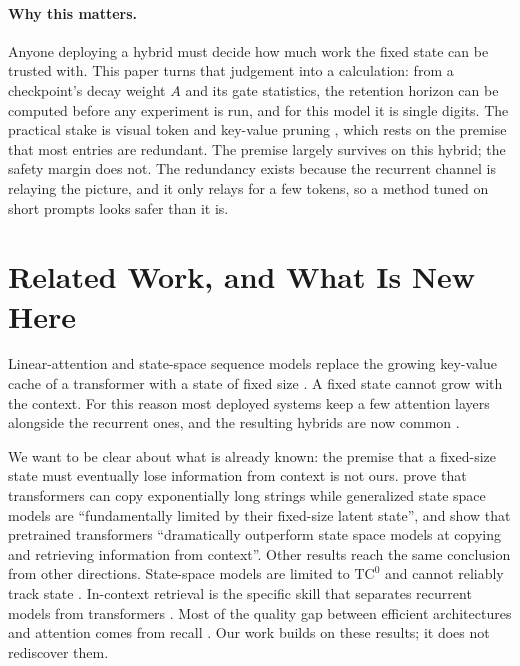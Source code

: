 \paragraph{Why this matters.} Anyone deploying a hybrid must decide how much
work the fixed state can be trusted with. This paper turns that judgement into
a calculation: from a checkpoint's decay weight $A$ and its gate statistics,
the retention horizon can be computed before any experiment is run, and for
this model it is single digits. The practical stake is visual token and
key-value pruning \citep{chen2024fastv,yang2024visionzip,shang2025prumerge,zhang2023h2o,li2024snapkv,xiao2024streaming},
which rests on the premise that most entries are redundant. The premise
largely survives on this hybrid; the safety margin does not. The redundancy
exists because the recurrent channel is relaying the picture, and it only
relays for a few tokens, so a method tuned on short prompts looks safer than
it is.

\section{Related Work, and What Is New Here}

Linear-attention and state-space sequence models replace the growing key-value
cache of a transformer with a state of fixed size
\citep{katharopoulos2020linear,gu2022s4,peng2023rwkv,gu2023mamba,dao2024mamba2,beck2024xlstm}.
A fixed state cannot grow with the context. For this reason most deployed
systems keep a few attention layers alongside the recurrent ones, and the
resulting hybrids are now common
\citep{lieber2024jamba,glorioso2024zamba,de2024griffin,ren2025samba,waleffe2024empirical}.

We want to be clear about what is already known: the premise that a fixed-size
state must eventually lose information from context is not ours.
\citet{jelassi2024copying} prove that transformers can copy exponentially long
strings while generalized state space models are ``fundamentally limited by
their fixed-size latent state'', and show that pretrained transformers
``dramatically outperform state space models at copying and retrieving
information from context''. Other results reach the same conclusion from other
directions. State-space models are limited to $\mathrm{TC}^0$ and cannot
reliably track state \citep{merrill2024illusion}. In-context retrieval is the
specific skill that separates recurrent models from transformers
\citep{wen2024rnns}. Most of the quality gap between efficient architectures
and attention comes from recall \citep{arora2023zoology,arora2024based}. Our
work builds on these results; it does not rediscover them.

